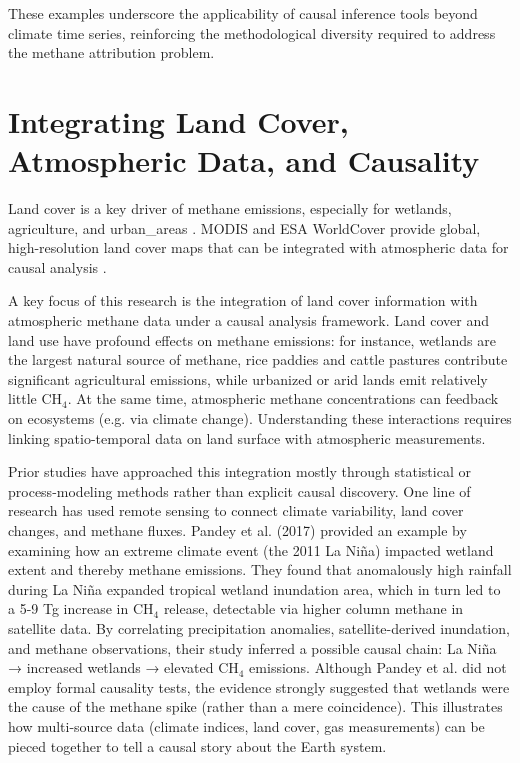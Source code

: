 These examples underscore the applicability of causal inference tools beyond climate time series, reinforcing the methodological diversity required to address the methane attribution problem.

\section{Integrating Land Cover, Atmospheric Data, and Causality}
Land cover is a key driver of methane emissions, especially for wetlands, agriculture, and \gls{urban_areas} \cite{Saunois2020, Karoff2023}. MODIS and ESA WorldCover provide global, high-resolution land cover maps that can be integrated with atmospheric data for causal analysis \cite{Friedl2010, Zhang2021}.

A key focus of this research is the integration of land cover information with atmospheric methane data under a causal analysis framework. Land cover and land use have profound effects on methane emissions: for instance, wetlands are the largest natural source of methane, rice paddies and cattle pastures contribute significant agricultural emissions, while urbanized or arid lands emit relatively little CH$_4$. At the same time, atmospheric methane concentrations can feedback on ecosystems (e.g. via climate change). Understanding these interactions requires linking spatio-temporal data on land surface with atmospheric measurements. 

Prior studies have approached this integration mostly through statistical or process-modeling methods rather than explicit causal discovery. One line of research has used remote sensing to connect climate variability, land cover changes, and methane fluxes. Pandey et al. (2017) \cite{Pandey2017} provided an example by examining how an extreme climate event (the 2011 La Ni\~na) impacted wetland extent and thereby methane emissions. They found that anomalously high rainfall during La Ni\~na expanded tropical wetland inundation area, which in turn led to a 5-9 Tg increase in CH$_4$ release, detectable via higher column methane in satellite data. By correlating precipitation anomalies, satellite-derived inundation, and methane observations, their study inferred a possible causal chain: La Ni\~na → increased wetlands → elevated CH$_4$ emissions. Although Pandey et al. did not employ formal causality tests, the evidence strongly suggested that wetlands were the cause of the methane spike (rather than a mere coincidence). This illustrates how multi-source data (climate indices, land cover, gas measurements) can be pieced together to tell a causal story about the Earth system.

